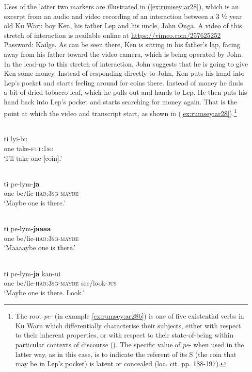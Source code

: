 \documentclass[output=paper]{langsci/langscibook}
\begin{document}
Uses of the latter two markers are illustrated in (\ref{ex:rumsey:ar28}), which is an excerpt from an audio and video recording of an interaction between a 3 ½ year old Ku Waru boy Ken, his father Lep and his uncle, John Onga. A video of this stretch of interaction is available online at \url{https://vimeo.com/257625252} Password: Kailge. As can be seen there, Ken is sitting in his father’s lap, facing away from his father toward the video camera, which is being operated by John. In the lead-up to this stretch of interaction, John suggests that he is going to give Ken some money. Instead of responding directly to John, Ken puts his hand into Lep’s pocket and starts feeling around for coins there. Instead of money he finds a bit of dried tobacco leaf, which he pulls out and hands to Lep. He then puts his hand back into Lep’s pocket and starts searching for money again. That is the point at which the video and transcript start, as shown in (\ref{ex:rumsey:ar28}).\footnote{The root \textit{pe}- (in example \ref{ex:rumsey:ar28b}) is one of five existential verbs in Ku Waru which differentially characterise their subjects, either with respect to their inherent properties, or with respect to their state-of-being within particular contexts of discourse (\citealt{Rumsey2002}). The specific value of \textit{pe}- when used in the latter way, as in this case, is to indicate the referent of its S (the coin that may be in Lep’s pocket) is latent or concealed (loc. cit. pp. 188-197).}


\ea \label{ex:rumsey:ar28}
	\ea \label{ex:rumsey:ar28a}
	\\
	\gll ti lyi-bu\\
	one take-\textsc{fut}:1\textsc{sg}\\
	\glt ‘I’ll take one [coin].’
	
	\ex \label{ex:rumsey:ar28b}
	\\
	\gll ti pe-lym-\textbf{ja}\\
	one be/lie-\textsc{hab}:3\textsc{sg}-\textsc{maybe}\\
	\glt ‘Maybe one is there.’
	
	\ex \label{ex:rumsey:ar28c}
	\\
	\gll ti pe-lym-\textbf{jaaaa}\\
	one be/lie-\textsc{hab}:3\textsc{sg}-\textsc{maybe}\\
	\glt ‘Maaaaybe one is there.’
	
	\ex \label{ex:rumsey:ar28d}
 	\\
	\gll ti pe-lym-\textbf{ja} kan-ui\\
	one be/lie-\textsc{hab}:3\textsc{sg}-\textsc{maybe} see/look-\textsc{jus}\\
	\glt ‘Maybe one is there. Look.’
	
\end{document}
